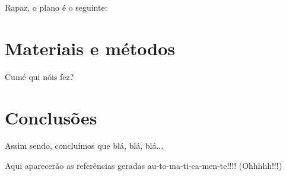 \documentclass[12pt,twoside,a4paper]{article}
\begin{document}
Rapaz, o plano é o seguinte:
 
\section{Materiais e métodos}
\label{sec:materials}

Cumé qui nóis fez?	

\section{Conclusões}
\label{sec:conclusions}

Assim sendo, concluímos que blá, blá, blá...

{}


Aqui aparecerão as referências geradas au-to-ma-ti-ca-men-te!!!! (Ohhhhh!!!)
\end{document}
